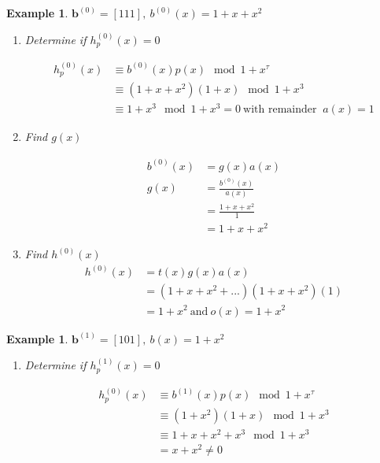 \documentclass[fontsize=12pt]{article}
\newtheorem{example}[theorem]{Example}
\begin{document}
\begin{example}
\label{ex1}
$\textbf{b}^{(0)}=[1 1 1 ],~b^{(0)}(x)=1+x+x^2$

\begin{enumerate}
\item Determine if $h_p^{(0)}(x) =0$

\begin{equation*}
\begin{split}
h_p^{(0)}(x)& \equiv b^{(0)}(x)p(x) \mod{1+x^{\tau}}\\
& \equiv (1+x+x^2)(1+x)  \mod{1+x^{3}}\\
&\equiv 1+x^3  \mod{1+x^{3}} =0 ~\text{with remainder }~ a(x) =1
\end{split}
\end{equation*}

\item Find $g(x)$
 
 \begin{equation*}
 \begin{split}
 b^{(0)}(x)&=g(x)a(x) \\
 g(x) &=\frac{b^{(0)}(x)}{a(x)}\\
 &=\frac{1+x+x^2}{1}\\
 &=1+x+x^2
 \end{split}
 \end{equation*}
 
 \item Find $h^{(0)}(x)$
 \begin{equation*}
 \begin{split}
 h^{(0)}(x)&=t(x)g(x)a(x) \\
 &=(1+x+x^2+...)(1+x+x^2)(1)\\
 &=1+x^2  ~\text{and}~ o(x)=1+x^2 
 \end{split}
 \end{equation*}
 
\end{enumerate}
\end{example}

\begin{example}
\label{ex2}
$\textbf{b}^{(1)}=[1 0 1],~ b(x)=1+x^2$

\begin{enumerate}
\item Determine if $h_p^{(1)}(x) =0$

\begin{equation*}
\begin{split}
h_p^{(0)}(x)& \equiv b^{(1)}(x)p(x) \mod{1+x^{\tau}}\\
& \equiv (1+x^2)(1+x)  \mod{1+x^{3}}\\
&\equiv 1+x+x^2+x^3  \mod{1+x^{3}}\\ &=x+x^2 \neq 0
\end{split}
\end{equation*}
\end{enumerate}
\end{example}
 
\end{document}
